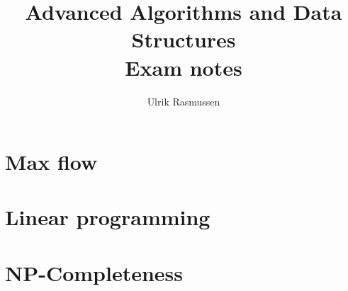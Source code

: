 \documentclass[a4paper, 10pt, oneside, article]{memoir}
\title{Advanced Algorithms and Data Structures\\Exam notes}
\author{Ulrik Rasmussen}
\begin{document}
\maketitle

\section{Max flow}


\newpage

\section{Linear programming}


\newpage

\section{NP-Completeness}


\end{document}
